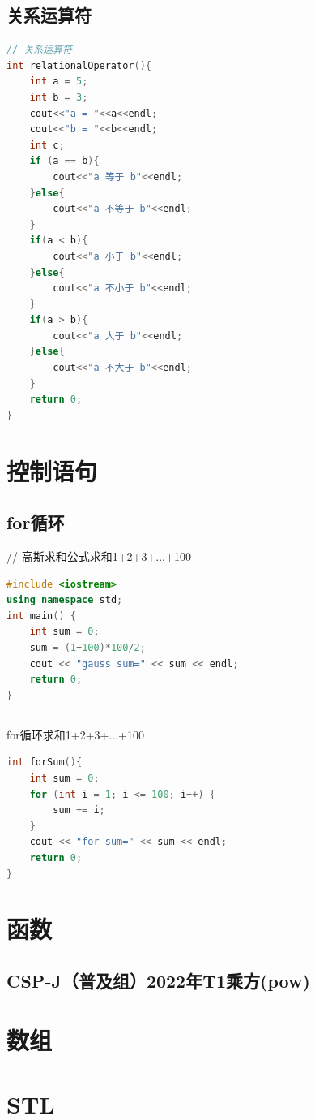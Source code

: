 \documentclass[12pt,twiside,a4paper]{ctexbook}
\numberwithin{chapter}{part}
\begin{document}
\section{关系运算符}
\begin{lstlisting}[language=C++]
// 关系运算符
int relationalOperator(){
	int a = 5;
	int b = 3;
	cout<<"a = "<<a<<endl;
	cout<<"b = "<<b<<endl;
	int c;
	if (a == b){
		cout<<"a 等于 b"<<endl;
	}else{
		cout<<"a 不等于 b"<<endl;
	}
	if(a < b){
		cout<<"a 小于 b"<<endl;
	}else{
		cout<<"a 不小于 b"<<endl;
	}
	if(a > b){
		cout<<"a 大于 b"<<endl;
	}else{
		cout<<"a 不大于 b"<<endl;
	}
	return 0;
}
\end{lstlisting}


\chapter{控制语句}
\section{for循环}
// 高斯求和公式求和1+2+3+...+100
\begin{lstlisting}[language=C++]
#include <iostream>
using namespace std;
int main() {
    int sum = 0;
    sum = (1+100)*100/2;
    cout << "gauss sum=" << sum << endl;
    return 0;
}
\end{lstlisting}

\section{}
for循环求和1+2+3+...+100\\
\begin{lstlisting}[language=C++]
int forSum(){
    int sum = 0;
    for (int i = 1; i <= 100; i++) {
        sum += i;
    }
    cout << "for sum=" << sum << endl;
    return 0;
}
\end{lstlisting}

\chapter{函数}
\section{CSP-J（普及组）2022年T1乘方(pow)}

\chapter{数组}

\chapter{STL}



\clearpage
\end{document}
